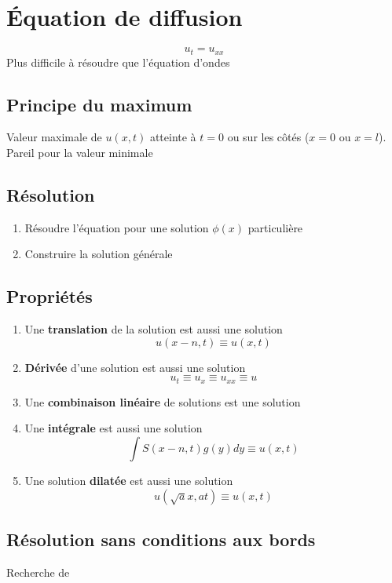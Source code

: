 \documentclass[resume]{subfiles}
\begin{document}
\section{Équation de diffusion}
$$\boxed{u_{t}=u_{xx}}$$
Plus difficile à résoudre que l'équation d'ondes
\subsection{Principe du maximum}
Valeur maximale de $u(x,t)$ atteinte à $t=0$ ou sur les côtés ($x=0$ ou $x=l$). Pareil pour la valeur minimale
\subsection{Résolution}
\begin{enumerate}
\item Résoudre l'équation pour une solution $\phi(x)$ particulière
\item Construire la solution générale
\end{enumerate}
\subsection{Propriétés}
\begin{enumerate}
\item Une \textbf{translation} de la solution est aussi une solution
$$u(x-n,t)\equiv u(x,t)$$
\item \textbf{Dérivée} d'une solution est aussi une solution
$$u_t\equiv u_x\equiv u_{xx}\equiv u$$
\item Une \textbf{combinaison linéaire} de solutions est une solution
\item Une \textbf{intégrale} est aussi une solution
$$\int S(x-n,t)g(y)dy\equiv u(x,t)$$
\item Une solution \textbf{dilatée} est aussi une solution
$$u(\sqrt{a}x,at)\equiv u(x,t)$$
\end{enumerate}
\subsection{Résolution sans conditions aux bords}
Recherche de 
\end{document}
